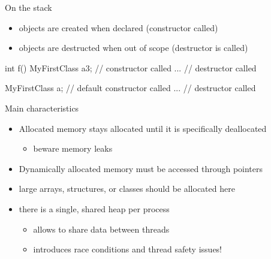 \begin{frame}[fragile]
  \begin{block}{On the stack}
    \begin{itemize}
    \item objects are created when declared (constructor called)
    \item objects are destructed when out of scope (destructor is called)
    \end{itemize}
  \end{block}
  \begin{cppcode}
    int f() {
      MyFirstClass a{3}; // constructor called
      ...
    } // destructor called

    {
      MyFirstClass a; // default constructor called
      ...
    }  // destructor called
  \end{cppcode}
\end{frame}

\begin{frame}[fragile]
  \begin{block}{Main characteristics}
    \begin{itemize}
    \item Allocated memory stays allocated until it is specifically deallocated
      \begin{itemize}
      \item beware memory leaks
      \end{itemize}
    \item Dynamically allocated memory must be accessed through pointers
    \item large arrays, structures, or classes should be allocated here
    \item there is a single, shared heap per process
      \begin{itemize}
      \item allows to share data between threads
      \item introduces race conditions and thread safety issues!
      \end{itemize}
    \end{itemize}
  \end{block}
\end{frame}

